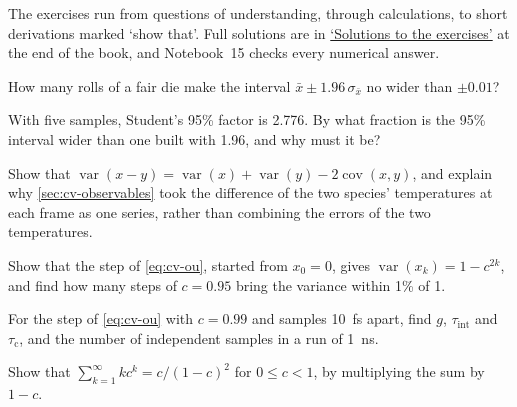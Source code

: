 \label{sec:cv-exercises}

The exercises run from questions of understanding, through calculations,
to short derivations marked `show that'. Full solutions are in
\hyperref[sec:cv-solutions]{`Solutions to the exercises'} at the end of
the book, and Notebook~15 checks every numerical answer.

\begin{exercise}
\label{ex:cv-rolls}
How many rolls of a fair die make the interval $\bar x \pm 1.96\,\sigma_{\bar
x}$ no wider than $\pm0.01$?
\end{exercise}

\begin{exercise}
\label{ex:cv-student}
With five samples, Student's 95\% factor is 2.776. By what fraction is the
95\% interval wider than one built with 1.96, and why must it be?
\end{exercise}

\begin{exercise}
\label{ex:cv-cov}
Show that $\operatorname{var}(x - y) = \operatorname{var}(x) +
\operatorname{var}(y) - 2\operatorname{cov}(x, y)$, and explain why
\cref{sec:cv-observables} took the difference of the two species'
temperatures at each frame as one series, rather than combining the errors
of the two temperatures.
\end{exercise}

\begin{exercise}
\label{ex:cv-ou-var}
Show that the step of \cref{eq:cv-ou}, started from $x_0 = 0$, gives
$\operatorname{var}(x_k) = 1 - c^{2k}$, and find how many steps of $c =
0.95$ bring the variance within 1\% of 1.
\end{exercise}

\begin{exercise}
\label{ex:cv-g-ou}
For the step of \cref{eq:cv-ou} with $c = 0.99$ and samples
\SI{10}{\femto\second} apart, find $g$, $\tau_{\mathrm{int}}$ and
$\tau_{\mathrm c}$, and the number of independent samples in a run of
\SI{1}{\nano\second}.
\end{exercise}

\begin{exercise}
\label{ex:cv-ksum}
Show that $\sum_{k=1}^\infty kc^k = c/(1 - c)^2$ for $0 \le c < 1$, by
multiplying the sum by $1 - c$.
\end{exercise}

